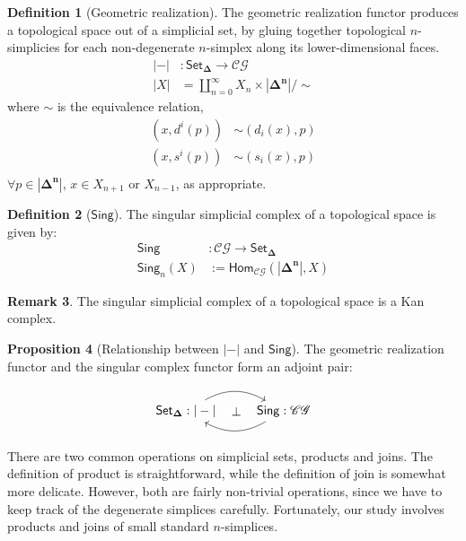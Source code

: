 \documentclass[10pt]{amsart}
\makeatletter
\newcommand{\8}{\ensuremath{\infty}}
\newcommand{\0}{\ensuremath{\overset{\rightarrow}{0}}}
\newcommand{\1}{\ensuremath{\mathbf{1}}}
\newcommand{\CG}{\ensuremath{\mathscr{CG}}}
\newcommand{\Hom}{\ensuremath{\mathsf{Hom}}}
\newcommand{\Simplex}[1]{\ensuremath{\boldsymbol{\Delta^{#1}}}}
\newcommand{\SSet}{\ensuremath{\mathsf{Set}_{\boldsymbol{\Delta}}}}
\newcommand{\Sing}{\ensuremath{\mathsf{Sing}}}
\theoremstyle{definition}
\newtheorem{definition}{Definition}[section]
\newtheorem{proposition}[definition]{Proposition}
\newtheorem{remark}[definition]{Remark}
\def\subsection{\@startsection{subsection}{2}
  \z@{.5\linespacing\@plus.7\linespacing}{.6\baselineskip}{\centering}}
\numberwithin{definition}{subsection}
\numberwithin{definition}{section}
\makeatother
\begin{document}
\begin{definition}[Geometric realization]
  The geometric realization functor produces a topological space out of a simplicial set, by gluing together topological $n$-simplicies for each non-degenerate $n$-simplex along its lower-dimensional faces.
  \begin{align*}
    |-| & : \SSet \rightarrow \CG                                  \\
    |X| & = \coprod_{n = 0}^{\infty} X_n \times |\Simplex{n}|/\sim
  \end{align*}
  where $\sim$ is the equivalence relation,
  \begin{align*}
    (x, d^i(p)) & \sim (d_i(x), p) \\
    (x, s^i(p)) & \sim (s_i(x), p) \\
  \end{align*}
  $\forall p \in |\Simplex{n}|$, $x \in X_{n + 1}$ or $X_{n - 1}$, as appropriate.
\end{definition}

\begin{definition}[\Sing]
  The singular simplicial complex of a topological space is given by:
  \begin{align*}
    \Sing      & : \CG \rightarrow \SSet       \\
    \Sing_n(X) & := \Hom_\CG(|\Simplex{n}|, X)
  \end{align*}
\end{definition}

\begin{remark}
  The singular simplicial complex of a topological space is a Kan complex.
\end{remark}

\begin{proposition}[Relationship between $|-|$ and \Sing]
  The geometric realization functor and the singular complex functor form an adjoint pair:

  \begin{equation*}
    \begin{tikzcd}
      \SSet : |-| \arrow[r, bend left] \arrow[r, phantom, "\bot" description] & \Sing : \CG \arrow[l, bend left]
    \end{tikzcd}
  \end{equation*}
\end{proposition}

\subsection{Operations}
There are two common operations on simplicial sets, products and joins. The definition of product is straightforward, while the definition of join is somewhat more delicate. However, both are fairly non-trivial operations, since we have to keep track of the degenerate simplices carefully. Fortunately, our study involves products and joins of small standard $n$-simplices.
\end{document}
